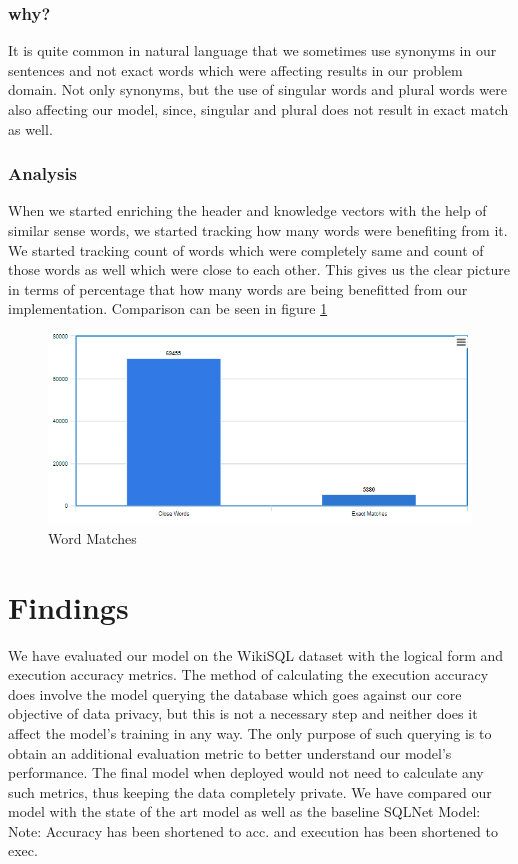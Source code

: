 \documentclass[12pt]{article}
\begin{document}
\subsubsection{why?}
It is quite common in natural language that we sometimes use synonyms in our sentences and not exact words which were affecting results in our problem domain. Not only synonyms, but the use of singular words and plural words were also affecting our model, since, singular and plural does not result in exact match as well. 

\subsubsection{Analysis}
When we started enriching the header and knowledge vectors with the help of similar sense words, we started tracking how many words were benefiting from it. We started tracking count of words which were completely same and count of those words as well which were close to each other. This gives us the clear picture in terms of percentage that how many words are being benefitted from our implementation. Comparison can be seen in figure \ref{WordMatches}

\begin{figure}[H]
    \includegraphics[width=450pt]{wordmatches}
	\caption{Word Matches}
    \label{WordMatches}
\end{figure}

\section{Findings}


We have evaluated our model on the WikiSQL dataset with
the logical form and execution accuracy metrics. The method
of calculating the execution accuracy does involve the model
querying the database which goes against our core objective of
data privacy, but this is not a necessary step and neither does
it affect the model’s training in any way. The only purpose of
such querying is to obtain an additional evaluation metric to
better understand our model’s performance. The final model
when deployed would not need to calculate any such metrics,
thus keeping the data completely private.
We have compared our model with the state of the art model
as well as the baseline SQLNet Model:
Note: Accuracy has been shortened to acc. and execution
has been shortened to exec.
\end{document}

